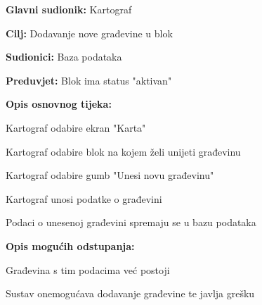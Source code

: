 					\noindent {}
					\begin{packed_item}
						
						\item \textbf{Glavni sudionik: }Kartograf
						\item  \textbf{Cilj:} Dodavanje nove građevine u blok
						\item  \textbf{Sudionici:} Baza podataka
						\item  \textbf{Preduvjet:} Blok ima status "aktivan"
						\item  \textbf{Opis osnovnog tijeka:}
						
						\item[] \begin{packed_enum}
							
							\item Kartograf odabire ekran "Karta"
							\item Kartograf odabire blok na kojem želi unijeti građevinu
							\item Kartograf odabire gumb "Unesi novu građevinu"
							\item Kartograf unosi podatke o građevini
							\item Podaci o unesenoj građevini spremaju se u bazu podataka
						\end{packed_enum}
						
						\item  \textbf{Opis mogućih odstupanja:}
						
						\item[] \begin{packed_item}
							
							\item[4.a] Građevina s tim podacima već postoji
							\item[] \begin{packed_enum}
								
								\item Sustav onemogućava dodavanje građevine te javlja grešku
								
							\end{packed_enum}
							
						\end{packed_item}
					\end{packed_item}
					\noindent {}
